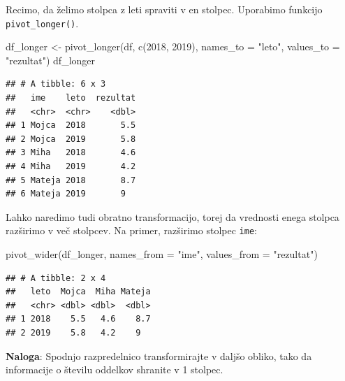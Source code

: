 \documentclass[
]{book}
\newenvironment{Shaded}{\begin{snugshade}}{\end{snugshade}}
\newcommand{\AttributeTok}[1]{\textcolor[rgb]{0.77,0.63,0.00}{#1}}
\newcommand{\FunctionTok}[1]{\textcolor[rgb]{0.00,0.00,0.00}{#1}}
\newcommand{\NormalTok}[1]{#1}
\newcommand{\OtherTok}[1]{\textcolor[rgb]{0.56,0.35,0.01}{#1}}
\newcommand{\StringTok}[1]{\textcolor[rgb]{0.31,0.60,0.02}{#1}}
\begin{document}
Recimo, da želimo stolpca z leti spraviti v en stolpec. Uporabimo funkcijo \texttt{pivot\_longer()}.

\begin{Shaded}
\begin{Highlighting}[]
\NormalTok{df\_longer }\OtherTok{\textless{}{-}} \FunctionTok{pivot\_longer}\NormalTok{(df, }\FunctionTok{c}\NormalTok{(}\StringTok{\textasciigrave{}}\AttributeTok{2018}\StringTok{\textasciigrave{}}\NormalTok{, }\StringTok{\textasciigrave{}}\AttributeTok{2019}\StringTok{\textasciigrave{}}\NormalTok{), }\AttributeTok{names\_to =} \StringTok{"leto"}\NormalTok{, }\AttributeTok{values\_to =} \StringTok{"rezultat"}\NormalTok{)}
\NormalTok{df\_longer}
\end{Highlighting}
\end{Shaded}

\begin{verbatim}
## # A tibble: 6 x 3
##   ime    leto  rezultat
##   <chr>  <chr>    <dbl>
## 1 Mojca  2018       5.5
## 2 Mojca  2019       5.8
## 3 Miha   2018       4.6
## 4 Miha   2019       4.2
## 5 Mateja 2018       8.7
## 6 Mateja 2019       9
\end{verbatim}

Lahko naredimo tudi obratno transformacijo, torej da vrednosti enega stolpca razširimo v več stolpcev. Na primer, razširimo stolpec \texttt{ime}:

\begin{Shaded}
\begin{Highlighting}[]
\FunctionTok{pivot\_wider}\NormalTok{(df\_longer, }\AttributeTok{names\_from =} \StringTok{"ime"}\NormalTok{, }\AttributeTok{values\_from =} \StringTok{"rezultat"}\NormalTok{)}
\end{Highlighting}
\end{Shaded}

\begin{verbatim}
## # A tibble: 2 x 4
##   leto  Mojca  Miha Mateja
##   <chr> <dbl> <dbl>  <dbl>
## 1 2018    5.5   4.6    8.7
## 2 2019    5.8   4.2    9
\end{verbatim}

\textbf{Naloga}: Spodnjo razpredelnico transformirajte v daljšo obliko, tako da informacije o številu oddelkov shranite v 1 stolpec.
\end{document}
